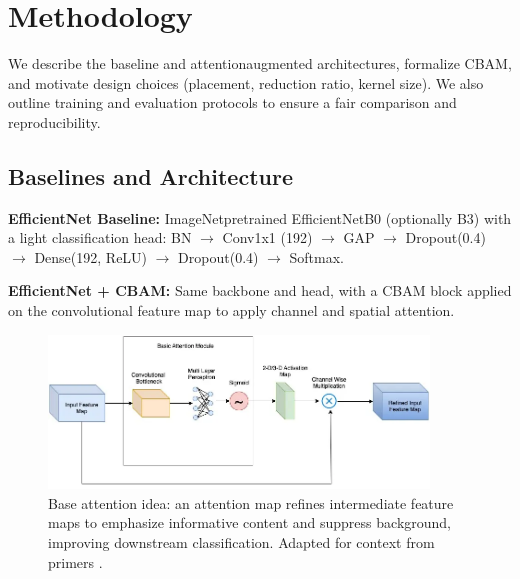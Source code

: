 \chapter{Methodology}
We describe the baseline and attention\textendash augmented architectures, formalize CBAM, and motivate design choices (placement, reduction ratio, kernel size). We also outline training and evaluation protocols to ensure a fair comparison and reproducibility.
\section{Baselines and Architecture}
\textbf{EfficientNet Baseline:} ImageNet\textendash pretrained EfficientNetB0 (optionally B3) with a light classification head: BN $\rightarrow$ Conv1x1 (192) $\rightarrow$ GAP $\rightarrow$ Dropout(0.4) $\rightarrow$ Dense(192, ReLU) $\rightarrow$ Dropout(0.4) $\rightarrow$ Softmax.

\textbf{EfficientNet + CBAM:} Same backbone and head, with a CBAM block applied on the convolutional feature map to apply channel and spatial attention.

\begin{figure}[t]
  \centering
  \includegraphics[width=0.9\textwidth]{../new_work/figures/about-cbam/base-attention-model.png}
  \caption{Base attention idea: an attention map refines intermediate feature maps to emphasize informative content and suppress background, improving downstream classification. Adapted for context from primers \cite{cbamMedium}.}
  \label{fig:base_attention}
\end{figure}

